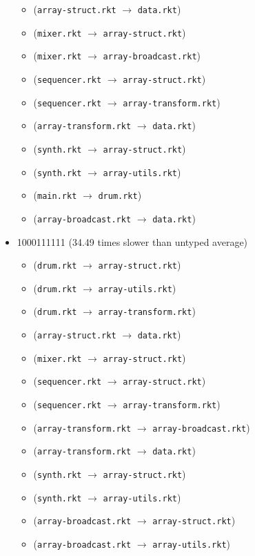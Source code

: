 \documentclass{article}
\newcommand{\mono}[1]{\texttt{#1}}
\begin{document}
\begin{itemize}
\begin{itemize}
  \item (\mono{array-struct.rkt} $\rightarrow$ \mono{data.rkt})
  \item (\mono{mixer.rkt} $\rightarrow$ \mono{array-struct.rkt})
  \item (\mono{mixer.rkt} $\rightarrow$ \mono{array-broadcast.rkt})
  \item (\mono{sequencer.rkt} $\rightarrow$ \mono{array-struct.rkt})
  \item (\mono{sequencer.rkt} $\rightarrow$ \mono{array-transform.rkt})
  \item (\mono{array-transform.rkt} $\rightarrow$ \mono{data.rkt})
  \item (\mono{synth.rkt} $\rightarrow$ \mono{array-struct.rkt})
  \item (\mono{synth.rkt} $\rightarrow$ \mono{array-utils.rkt})
  \item (\mono{main.rkt} $\rightarrow$ \mono{drum.rkt})
  \item (\mono{array-broadcast.rkt} $\rightarrow$ \mono{data.rkt})
  \end{itemize}
\item 1000111111 (34.49 times slower than untyped average)
  \begin{itemize}
  \item (\mono{drum.rkt} $\rightarrow$ \mono{array-struct.rkt})
  \item (\mono{drum.rkt} $\rightarrow$ \mono{array-utils.rkt})
  \item (\mono{drum.rkt} $\rightarrow$ \mono{array-transform.rkt})
  \item (\mono{array-struct.rkt} $\rightarrow$ \mono{data.rkt})
  \item (\mono{mixer.rkt} $\rightarrow$ \mono{array-struct.rkt})
  \item (\mono{sequencer.rkt} $\rightarrow$ \mono{array-struct.rkt})
  \item (\mono{sequencer.rkt} $\rightarrow$ \mono{array-transform.rkt})
  \item (\mono{array-transform.rkt} $\rightarrow$ \mono{array-broadcast.rkt})
  \item (\mono{array-transform.rkt} $\rightarrow$ \mono{data.rkt})
  \item (\mono{synth.rkt} $\rightarrow$ \mono{array-struct.rkt})
  \item (\mono{synth.rkt} $\rightarrow$ \mono{array-utils.rkt})
  \item (\mono{array-broadcast.rkt} $\rightarrow$ \mono{array-struct.rkt})
  \item (\mono{array-broadcast.rkt} $\rightarrow$ \mono{array-utils.rkt})

\end{itemize}
\end{itemize}
\end{document}
